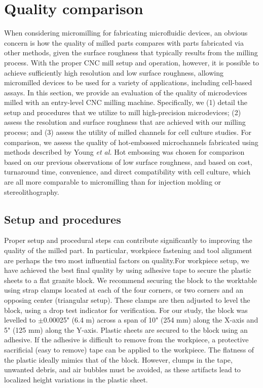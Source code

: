 \section{Quality comparison}
When considering micromilling for fabricating microfluidic devices, an obvious concern is how the quality of milled parts compares with parts fabricated via other methods, given the surface roughness that typically results from the milling process. With the proper CNC mill setup and operation, however, it is possible to achieve sufficiently high resolution and low surface roughness, allowing micromilled devices to be used for a variety of applications, including cell-based assays.  In this section, we provide an evaluation of the quality of microdevices milled with an entry-level CNC milling machine. Specifically, we (1) detail the setup and procedures that we utilize to mill high-precision microdevices; (2) assess the resolution and surface roughness that are achieved with our milling process; and (3) assess the utility of milled channels for cell culture studies. For comparison, we assess the quality of hot-embossed microchannels fabricated using methods described by Young \textit{et al.} \cite{Young2011} Hot embossing was chosen for comparison based on our previous observations of low surface roughness, and based on cost, turnaround time, convenience, and direct compatibility with cell culture, which are all more comparable to micromilling than for injection molding or stereolithography. 


\subsection{Setup and procedures}
Proper setup and procedural steps can contribute significantly to improving the quality of the milled part. In particular, workpiece fastening and tool alignment are perhaps the two most influential factors on quality.For workpiece setup, we have achieved the best final quality by using adhesive tape to secure the plastic sheets to a flat granite block. We recommend securing the block to the worktable using strap clamps located at each of the four corners, or two corners and an opposing center (triangular setup).  These clamps are then adjusted to level the block, using a drop test indicator for verification. For our study, the block was levelled to $\pm$0.00025" (6.4 \textmu m) across a span of 10" (254 mm) along the X-axis and 5" (125 mm) along the Y-axis. Plastic sheets are secured to the block using an adhesive. If the adhesive is difficult to remove from the workpiece, a protective sacrificial (easy to remove) tape can be applied to the workpiece. The flatness of the plastic ideally mimics that of the block. However, clumps in the tape, unwanted debris, and air bubbles must be avoided, as these artifacts lead to localized height variations in the plastic sheet.


